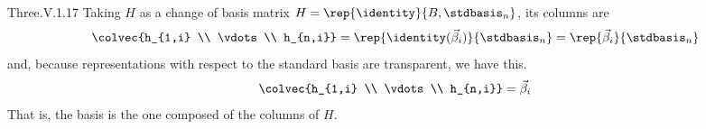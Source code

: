 \begin{ans}{Three.V.1.17}
       Taking $H$ as a change of basis matrix
       $H=\rep{\identity}{B,\stdbasis_n}$,
       its columns are
       \begin{equation*}
         \colvec{h_{1,i} \\ \vdots \\ h_{n,i}}
         =\rep{\identity(\vec{\beta}_i)}{\stdbasis_n}
         =\rep{\vec{\beta}_i}{\stdbasis_n}
       \end{equation*}
       and, because representations with respect to the standard basis
       are transparent, we have this.
       \begin{equation*}
         \colvec{h_{1,i} \\ \vdots \\ h_{n,i}}
         =\vec{\beta}_i
       \end{equation*}
       That is, the basis is the one composed of the columns of \( H \).
    
\end{ans}
